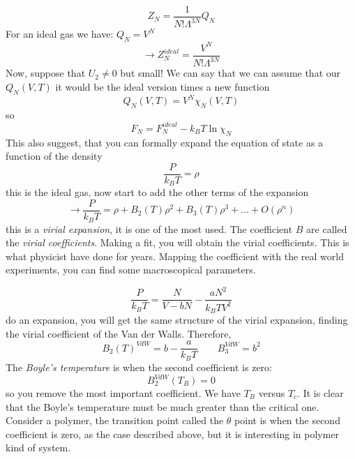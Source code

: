 \documentclass[../main/main.tex]{subfiles}
\begin{document}
\begin{equation}
  Z_N = \frac{1}{N! \Lambda ^{3N} } Q_N
\end{equation}
For an ideal gas we have: \( Q_N = V^N \)
\begin{equation}
  \rightarrow Z_N^{ideal} = \frac{V^N}{N! \Lambda ^{3N}}
\end{equation}
Now, suppose that \( U_2 \neq 0  \) but small! We can say that we can assume that our \( Q_N (V,T) \) it would be the ideal version times a new function
\begin{equation}
  Q_N (V,T)=V^N \chi _N (V,T)
\end{equation}
so
\begin{equation}
  F_N = F_N^{ideal} - k_B T \ln{\chi _N}
\end{equation}
This also suggest, that you can formally expand the equation of state as a function of the density
\begin{equation}
  \frac{P}{k_B T} = \rho
\end{equation}
this is the ideal gas, now start to add the other terms of the expansion
\begin{equation}
  \rightarrow \frac{P}{k_B T} = \rho + B_2 (T) \rho ^2 + B_3 (T)\rho ^3+ \dots + O(\rho ^n)
\end{equation}
this is a \emph{virial expansion}, it is one of the most used. The coefficient \( B \) are called the \emph{virial coefficients}.  Making a fit, you will obtain the virial coefficients. This is what physicist have done for years. Mapping the coefficient with the real world experiments, you can find some macroscopical parameters.

\begin{equation}
  \frac{P}{k_B T} = \frac{N}{V-bN} - \frac{a N^2}{k_B T V^2}
\end{equation}
do an expansion, you will get the same structure of the virial expansion, finding the virial coefficient of the Van der Walls. Therefore,
\begin{equation}
  B_2 (T)^{VdW} = b - \frac{a}{k_B T} \qquad B_3^{VdW} = b^2
\end{equation}
The \emph{Boyle's temperature} is when the second coefficient is zero:
\begin{equation}
  B_2^{VdW} (T_B) = 0
\end{equation}
so you remove the most important coefficient.
We have \( T_B \) versus \( T_c \). It is clear that the Boyle's temperature must be much greater than the critical one. Consider a polymer, the transition point called the \( \theta  \) point is when the second coefficient is zero, as the case described above, but it is interesting in polymer kind of system.
\end{document}
